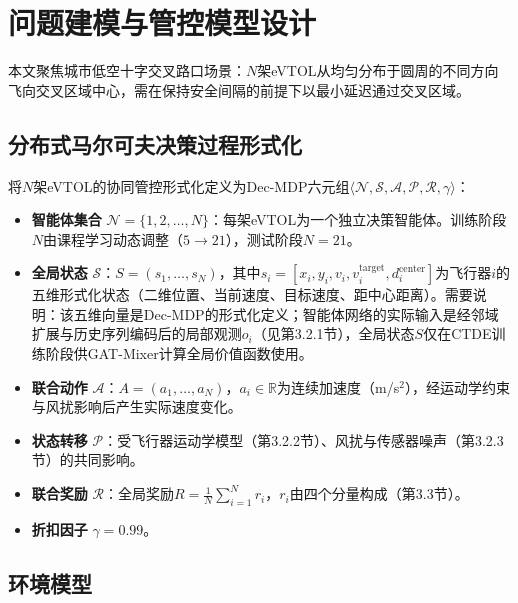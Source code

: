 \documentclass[12pt,a4paper,UTF8]{ctexart}
\begin{document}
\section{问题建模与管控模型设计}

本文聚焦城市低空十字交叉路口场景：$N$架eVTOL从均匀分布于圆周的不同方向飞向交叉区域中心，需在保持安全间隔的前提下以最小延迟通过交叉区域。

\subsection{分布式马尔可夫决策过程形式化}

将$N$架eVTOL的协同管控形式化定义为Dec-MDP六元组$\langle \mathcal{N}, \mathcal{S}, \mathcal{A}, \mathcal{P}, \mathcal{R}, \gamma \rangle$：

\begin{itemize}
    \item \textbf{智能体集合} $\mathcal{N} = \{1, 2, \ldots, N\}$：每架eVTOL为一个独立决策智能体。训练阶段$N$由课程学习动态调整（$5\to21$），测试阶段$N=21$。
    \item \textbf{全局状态} $\mathcal{S}$：$S = (s_1, \ldots, s_N)$，其中$s_i = [x_i, y_i, v_i, v_i^{\text{target}}, d_i^{\text{center}}]$为飞行器$i$的五维形式化状态（二维位置、当前速度、目标速度、距中心距离）。需要说明：该五维向量是Dec-MDP的形式化定义；智能体网络的实际输入是经邻域扩展与历史序列编码后的局部观测$o_i$（见第3.2.1节），全局状态$S$仅在CTDE训练阶段供GAT-Mixer计算全局价值函数使用。
    \item \textbf{联合动作} $\mathcal{A}$：$A = (a_1, \ldots, a_N)$，$a_i \in \mathbb{R}$为连续加速度（m/s$^2$），经运动学约束与风扰影响后产生实际速度变化。
    \item \textbf{状态转移} $\mathcal{P}$：受飞行器运动学模型（第3.2.2节）、风扰与传感器噪声（第3.2.3节）的共同影响。
    \item \textbf{联合奖励} $\mathcal{R}$：全局奖励$R = \frac{1}{N}\sum_{i=1}^{N} r_i$，$r_i$由四个分量构成（第3.3节）。
    \item \textbf{折扣因子} $\gamma = 0.99$。
\end{itemize}

\subsection{环境模型}
\end{document}
